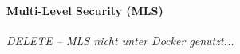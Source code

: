\documentclass[../main.tex]{subfiles}
\begin{document}


				\paragraph{Multi-Level Security (MLS)}
					\emph{DELETE -- MLS nicht unter Docker genutzt...}



\end{document}
